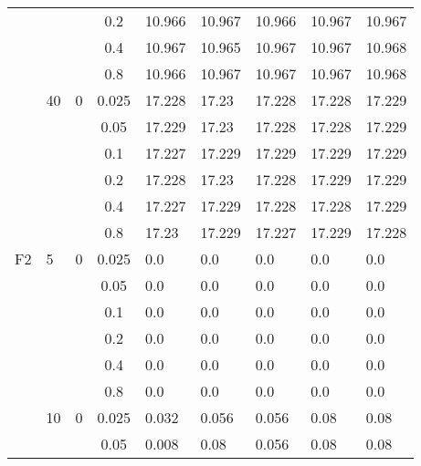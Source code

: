 \begin{longtable}{|l|l|l|c|l|l|l|l|l|}
\cmidrule{4-9} &     &          & 0.2            & 10.966     & 10.967     & 10.966     & 10.967     & 10.967     \\
\cmidrule{4-9} &     &          & 0.4            & 10.967     & 10.965     & 10.967     & 10.967     & 10.968     \\
\cmidrule{4-9} &     &          & 0.8            & 10.966     & 10.967     & 10.967     & 10.967     & 10.968     \\
\cmidrule{2-9} & 40  & 0        & 0.025          & 17.228     & 17.23      & 17.228     & 17.228     & 17.229     \\
\cmidrule{4-9} &     &          & 0.05           & 17.229     & 17.23      & 17.228     & 17.228     & 17.229     \\
\cmidrule{4-9} &     &          & 0.1            & 17.227     & 17.229     & 17.229     & 17.229     & 17.229     \\
\cmidrule{4-9} &     &          & 0.2            & 17.228     & 17.23      & 17.228     & 17.229     & 17.229     \\
\cmidrule{4-9} &     &          & 0.4            & 17.227     & 17.229     & 17.228     & 17.228     & 17.229     \\
\cmidrule{4-9} &     &          & 0.8            & 17.23      & 17.229     & 17.227     & 17.229     & 17.228     \\ \midrule
F2             & 5   & 0        & 0.025          & 0.0        & 0.0        & 0.0        & 0.0        & 0.0        \\
\cmidrule{4-9} &     &          & 0.05           & 0.0        & 0.0        & 0.0        & 0.0        & 0.0        \\
\cmidrule{4-9} &     &          & 0.1            & 0.0        & 0.0        & 0.0        & 0.0        & 0.0        \\
\cmidrule{4-9} &     &          & 0.2            & 0.0        & 0.0        & 0.0        & 0.0        & 0.0        \\
\cmidrule{4-9} &     &          & 0.4            & 0.0        & 0.0        & 0.0        & 0.0        & 0.0        \\
\cmidrule{4-9} &     &          & 0.8            & 0.0        & 0.0        & 0.0        & 0.0        & 0.0        \\
\cmidrule{2-9} & 10  & 0        & 0.025          & 0.032      & 0.056      & 0.056      & 0.08       & 0.08       \\
\cmidrule{4-9} &     &          & 0.05           & 0.008      & 0.08       & 0.056      & 0.08       & 0.08       \\

\end{longtable}
